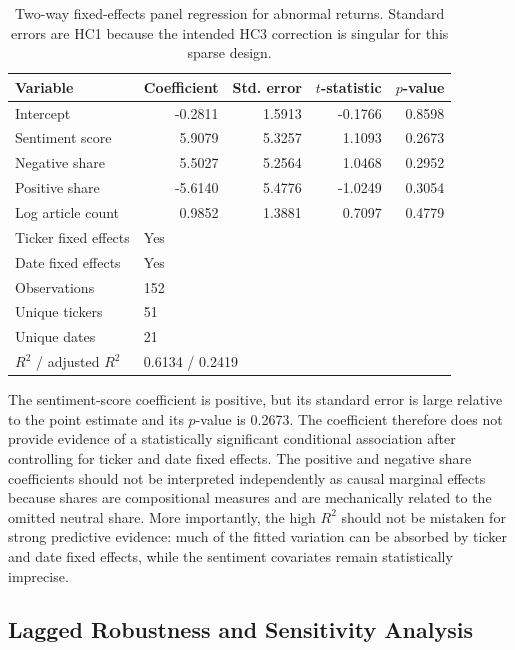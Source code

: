 \begin{table}[htbp]
\centering
\caption{Two-way fixed-effects panel regression for abnormal returns. Standard errors are HC1 because the intended HC3 correction is singular for this sparse design.}
\label{tab:panel-regression}
\begin{tabular}{lrrrr}
\toprule
\textbf{Variable} & \textbf{Coefficient} & \textbf{Std. error} & \textbf{$t$-statistic} & \textbf{$p$-value} \\
\midrule
Intercept & -0.2811 & 1.5913 & -0.1766 & 0.8598 \\
Sentiment score & 5.9079 & 5.3257 & 1.1093 & 0.2673 \\
Negative share & 5.5027 & 5.2564 & 1.0468 & 0.2952 \\
Positive share & -5.6140 & 5.4776 & -1.0249 & 0.3054 \\
Log article count & 0.9852 & 1.3881 & 0.7097 & 0.4779 \\
\midrule
Ticker fixed effects & \multicolumn{4}{l}{Yes} \\
Date fixed effects & \multicolumn{4}{l}{Yes} \\
Observations & \multicolumn{4}{l}{152} \\
Unique tickers & \multicolumn{4}{l}{51} \\
Unique dates & \multicolumn{4}{l}{21} \\
$R^2$ / adjusted $R^2$ & \multicolumn{4}{l}{0.6134 / 0.2419} \\
\bottomrule
\end{tabular}
\end{table}

The sentiment-score coefficient is positive, but its standard error is large relative to the point estimate and its $p$-value is 0.2673. The coefficient therefore does not provide evidence of a statistically significant conditional association after controlling for ticker and date fixed effects. The positive and negative share coefficients should not be interpreted independently as causal marginal effects because shares are compositional measures and are mechanically related to the omitted neutral share. More importantly, the high $R^2$ should not be mistaken for strong predictive evidence: much of the fitted variation can be absorbed by ticker and date fixed effects, while the sentiment covariates remain statistically imprecise.

\subsection{Lagged Robustness and Sensitivity Analysis}
\label{subsec:lag-robustness}

